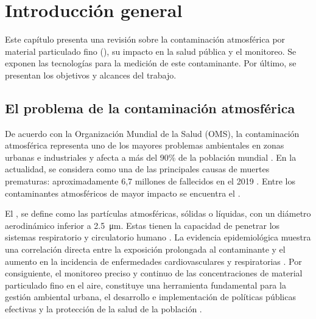 


\chapter{Introducción general} %

\label{Chapter1} %
\label{IntroGeneral}








Este capítulo presenta una revisión sobre la contaminación atmosférica por material particulado fino (\MPF), su impacto en la salud pública y el monitoreo. Se exponen las tecnologías para la medición de este contaminante. Por último, se presentan los objetivos y alcances del trabajo.


\section{El problema de la contaminación atmosférica}


De acuerdo con la Organización Mundial de la Salud (OMS), la contaminación atmosférica representa uno de los mayores problemas ambientales en zonas urbanas e industriales y afecta a más del 90\% de la población mundial \citep{WHO2021guidelines}. En la actualidad, se considera como una de las principales causas de muertes prematuras: aproximadamente 6,7 millones de fallecidos en el 2019 \citep{Errigo2020}. Entre los contaminantes atmosféricos de mayor impacto se encuentra el \MPF.

El \MPF, se define como las partículas atmosféricas, sólidas o líquidas, con un diámetro aerodinámico inferior a \SI{2,5}{\micro\meter}. Estas tienen la capacidad de penetrar los sistemas respiratorio y circulatorio humano \citep{WHO2021, Kodros2018}. La evidencia epidemiológica muestra una correlación directa entre la exposición prolongada al contaminante y el aumento en la incidencia de enfermedades cardiovasculares y respiratorias \citep{Jordi2022}. Por consiguiente, el monitoreo preciso y continuo de las concentraciones de material particulado fino en el aire, constituye una herramienta fundamental para la gestión ambiental urbana, el desarrollo e implementación de políticas públicas efectivas y la protección de la salud de la población \citep{Nasar2024}.

